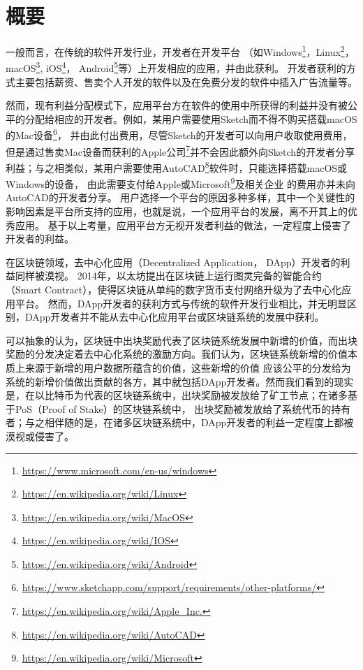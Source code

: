 \section{概要}

一般而言，在传统的软件开发行业，开发者在开发平台
（如Windows\footnote{\url{https://www.microsoft.com/en-us/windows}}，Linux\footnote{\url{https://en.wikipedia.org/wiki/Linux}}，
macOS\footnote{\url{https://en.wikipedia.org/wiki/MacOS}},
iOS\footnote{\url{https://en.wikipedia.org/wiki/IOS}}，
Android\footnote{\url{https://en.wikipedia.org/wiki/Android}}等）上开发相应的应用，并由此获利。
开发者获利的方式主要包括薪资、售卖个人开发的软件以及在免费分发的软件中插入广告流量等。

然而，现有利益分配模式下，应用平台方在软件的使用中所获得的利益并没有被公平的分配给相应的开发者。例如，某用户需要使用Sketch而不得不购买搭载macOS的Mac设备\footnote{\url{https://www.sketchapp.com/support/requirements/other-platforms/}}，
并由此付出费用，尽管Sketch的开发者可以向用户收取使用费用，
但是通过售卖Mac设备而获利的Apple公司\footnote{\url{https://en.wikipedia.org/wiki/Apple_Inc.}}并不会因此额外向Sketch的开发者分享利益；与之相类似，某用户需要使用AutoCAD\footnote{\url{https://en.wikipedia.org/wiki/AutoCAD}}软件时，只能选择搭载macOS或Windows的设备，
由此需要支付给Apple或Microsoft\footnote{\url{https://en.wikipedia.org/wiki/Microsoft}}及相关企业
的费用亦并未向AutoCAD的开发者分享。
用户选择一个平台的原因多种多样，其中一个关键性的影响因素是平台所支持的应用，也就是说，一个应用平台的发展，离不开其上的优秀应用。
基于以上考量，应用平台方无视开发者利益的做法，一定程度上侵害了开发者的利益。

在区块链领域，去中心化应用（Decentralized Application， DApp）开发者的利益同样被漠视。
2014年，以太坊提出在区块链上运行图灵完备的智能合约（Smart Contract），使得区块链从单纯的数字货币支付网络升级为了去中心化应用平台。
然而，DApp开发者的获利方式与传统的软件开发行业相比，并无明显区别，DApp开发者并不能从去中心化应用平台或区块链系统的发展中获利。

可以抽象的认为，区块链中出块奖励代表了区块链系统发展中新增的价值，而出块奖励的分发决定着去中心化系统的激励方向。我们认为，区块链系统新增的价值本质上来源于新增的用户数据所蕴含的价值，这些新增的价值
应该公平的分发给为系统的新增价值做出贡献的各方，其中就包括DApp开发者。然而我们看到的现实是，在以比特币为代表的区块链系统中，出块奖励被发放给了矿工节点；在诸多基于PoS（Proof of Stake）的区块链系统中，
出块奖励被发放给了系统代币的持有者；与之相伴随的是，在诸多区块链系统中，DApp开发者的利益一定程度上都被漠视或侵害了。

